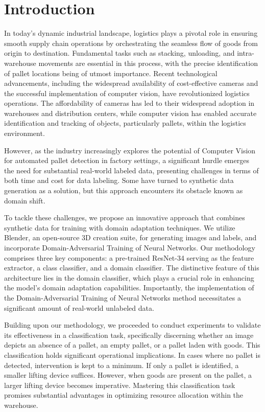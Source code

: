 \documentclass[nonacm, sigconf]{acmart}
\begin{document}
\section{Introduction}
In today's dynamic industrial landscape, logistics plays a pivotal role in ensuring smooth supply chain operations by orchestrating the seamless flow of goods from origin to destination. Fundamental tasks such as stacking, unloading, and intra-warehouse movements are essential in this process, with the precise identification of pallet locations being of utmost importance. Recent technological advancements, including the widespread availability of cost-effective cameras and the successful implementation of computer vision, have revolutionized logistics operations\cite{21,22, hoang2019object, hoang2020object, vu2024occlusion, palleschi2020fully}. The affordability of cameras has led to their widespread adoption in warehouses and distribution centers, while computer vision has enabled accurate identification and tracking of objects\cite{26, 27, 28, hoang2016sub, hoang2022context, hoang2023grasp, hoang2022voting}, particularly pallets, within the logistics environment.

\noindent However, as the industry increasingly explores the potential of Computer Vision for automated pallet detection in factory settings, a significant hurdle emerges the need for substantial real-world labeled data, presenting challenges in terms of both time and cost for data labeling. Some have turned to synthetic data generation as a solution\cite{1}\cite{2}\cite{3}, but this approach encounters its obstacle known as domain shift.

\noindent To tackle these challenges, we propose an innovative approach that combines synthetic data for training with domain adaptation techniques. We utilize Blender, an open-source 3D creation suite, for generating images and labels, and incorporate Domain-Adversarial Training of Neural Networks\cite{4}. Our methodology comprises three key components: a pre-trained ResNet-34\cite{6} serving as the feature extractor, a class classifier, and a domain classifier. The distinctive feature of this architecture lies in the domain classifier, which plays a crucial role in enhancing the model's domain adaptation capabilities. Importantly, the implementation of the Domain-Adversarial Training of Neural Networks method necessitates a significant amount of real-world unlabeled data.

\noindent Building upon our methodology, we proceeded to conduct experiments to validate its effectiveness in a classification task, specifically discerning whether an image depicts an absence of a pallet, an empty pallet, or a pallet laden with goods. This classification holds significant operational implications. In cases where no pallet is detected, intervention is kept to a minimum. If only a pallet is identified, a smaller lifting device suffices. However, when goods are present on the pallet, a larger lifting device becomes imperative. Mastering this classification task promises substantial advantages in optimizing resource allocation within the warehouse.
\end{document}
